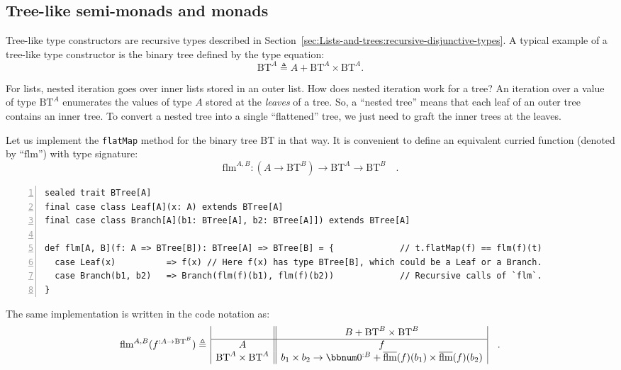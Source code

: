 \subsection{Tree-like semi-monads and monads\label{subsec:Tree-like-semimonads-and-monads}}

Tree-like type constructors are recursive types described in Section~\ref{sec:Lists-and-trees:recursive-disjunctive-types}.
A typical example of a tree-like type constructor is the binary tree
defined by the type equation:
\[
\text{BT}^{A}\triangleq A+\text{BT}^{A}\times\text{BT}^{A}.
\]

For lists, nested iteration goes over inner lists stored in an outer
list. How does nested iteration work for a tree? An iteration over
a value of type $\text{BT}^{A}$ enumerates the values of type $A$
stored at the \emph{leaves} of a tree. So, a \textsf{``}nested tree\textsf{''} means
that each leaf of an outer tree contains an inner tree. To convert
a nested tree into a single \textsf{``}flattened\textsf{''} tree, we just need to
graft the inner trees at the leaves. 

Let us implement the \lstinline!flatMap! method for the binary tree
$\text{BT}$ in that way. It is convenient to define an equivalent
curried function (denoted by \textsf{``}$\text{flm}$\textsf{''}) with type signature:
\[
\text{flm}^{A,B}:(A\rightarrow\text{BT}^{B})\rightarrow\text{BT}^{A}\rightarrow\text{BT}^{B}\quad.
\]
\begin{lstlisting}[numbers=left]
sealed trait BTree[A]
final case class Leaf[A](x: A) extends BTree[A]
final case class Branch[A](b1: BTree[A], b2: BTree[A]]) extends BTree[A]

def flm[A, B](f: A => BTree[B]): BTree[A] => BTree[B] = {             // t.flatMap(f) == flm(f)(t)
  case Leaf(x)          => f(x) // Here f(x) has type BTree[B], which could be a Leaf or a Branch.
  case Branch(b1, b2)   => Branch(flm(f)(b1), flm(f)(b2))             // Recursive calls of `flm`.
}
\end{lstlisting}
The same implementation is written in the code notation as:
\[
\text{flm}^{A,B}(f^{:A\rightarrow\text{BT}^{B}})\triangleq\,\begin{array}{|c||c|}
 & B+\text{BT}^{B}\times\text{BT}^{B}\\
\hline A & f\\
\text{BT}^{A}\times\text{BT}^{A} & b_{1}\times b_{2}\rightarrow\bbnum 0^{:B}+\overline{\text{flm}}(f)(b_{1})\times\overline{\text{flm}}(f)(b_{2})
\end{array}\quad.
\]

